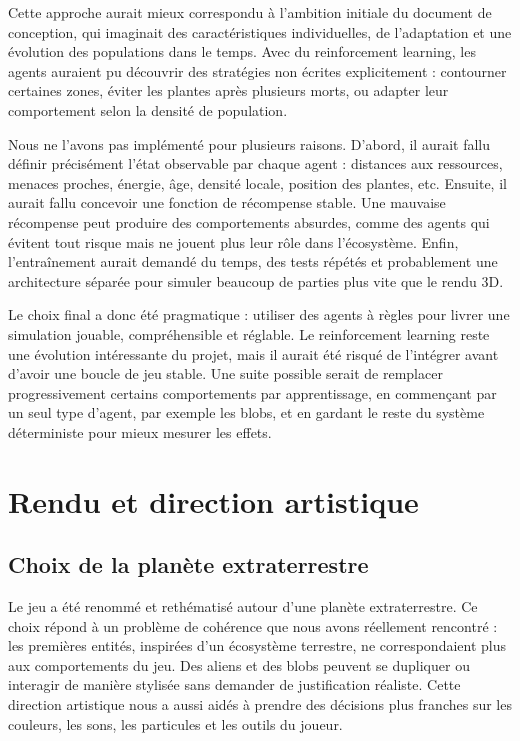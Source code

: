﻿\documentclass[11pt,a4paper]{article}
\begin{document}
Cette approche aurait mieux correspondu à l'ambition initiale du document de conception, qui imaginait des caractéristiques individuelles, de l'adaptation et une évolution des populations dans le temps. Avec du reinforcement learning, les agents auraient pu découvrir des stratégies non écrites explicitement : contourner certaines zones, éviter les plantes après plusieurs morts, ou adapter leur comportement selon la densité de population.

Nous ne l'avons pas implémenté pour plusieurs raisons. D'abord, il aurait fallu définir précisément l'état observable par chaque agent : distances aux ressources, menaces proches, énergie, âge, densité locale, position des plantes, etc. Ensuite, il aurait fallu concevoir une fonction de récompense stable. Une mauvaise récompense peut produire des comportements absurdes, comme des agents qui évitent tout risque mais ne jouent plus leur rôle dans l'écosystème. Enfin, l'entraînement aurait demandé du temps, des tests répétés et probablement une architecture séparée pour simuler beaucoup de parties plus vite que le rendu 3D.

Le choix final a donc été pragmatique : utiliser des agents à règles pour livrer une simulation jouable, compréhensible et réglable. Le reinforcement learning reste une évolution intéressante du projet, mais il aurait été risqué de l'intégrer avant d'avoir une boucle de jeu stable. Une suite possible serait de remplacer progressivement certains comportements par apprentissage, en commençant par un seul type d'agent, par exemple les blobs, et en gardant le reste du système déterministe pour mieux mesurer les effets.

\section{Rendu et direction artistique}

\subsection{Choix de la planète extraterrestre}

Le jeu a été renommé et rethématisé autour d'une planète extraterrestre. Ce choix répond à un problème de cohérence que nous avons réellement rencontré : les premières entités, inspirées d'un écosystème terrestre, ne correspondaient plus aux comportements du jeu. Des aliens et des blobs peuvent se dupliquer ou interagir de manière stylisée sans demander de justification réaliste. Cette direction artistique nous a aussi aidés à prendre des décisions plus franches sur les couleurs, les sons, les particules et les outils du joueur.
\end{document}
